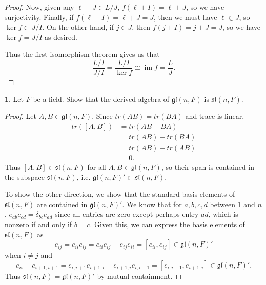 \documentclass[12pt]{article}
\DeclareMathOperator{\im}{im}
\newcommand{\gl}{\mathfrak{gl}}
\renewcommand{\sl}{\mathfrak{sl}}
\theoremstyle{definition}
\newtheorem{ex}{}
\begin{document}
\begin{proof}
	Now, given any $\ell + J \in L/J$, $f(\ell + I) = \ell + J$, so we have surjectivity.
	Finally, if $f(\ell + I) = \ell + J = J$, then we must have $\ell \in J$, so $\ker f \subset J/I$.
	On the other hand, if $j \in J$, then $f(j + I) = j + J = J$, so we have $\ker f = J/I$ as desired.

	Thus the first isomorphism theorem gives us that \begin{equation*}
		\frac{L/I}{J/I} = \frac{L/I}{\ker f} \cong \im f = \frac{L}{J}.
	\end{equation*}
\end{proof}

\begin{ex}
	Let $F$ be a field.
	Show that the derived algebra of $\gl(n, F)$ is $\sl(n, F)$.
\end{ex}
\begin{proof}
	Let $A, B \in \gl(n, F)$.
	Since $tr(AB) = tr(BA)$ and trace is linear, \begin{align*}
		tr([A, B]) & = tr(AB - BA)     \\
		           & = tr(AB) - tr(BA) \\
		           & = tr(AB) - tr(AB) \\
		           & = 0.
	\end{align*}
	Thus $[A, B] \in \sl(n, F)$ for all $A, B \in \gl(n, F)$, so their span is contained in the subspace $\sl(n, F)$, i.e. $\gl(n, F)' \subset \sl(n, F)$.

	To show the other direction, we show that the standard basis elements of $\sl(n, F)$ are contained in $\gl(n, F)'$.
	We know that for $a,b,c,d$ between 1 and $n$, $e_{ab}e_{cd} = \delta_{bc}e_{ad}$ since all entries are zero except perhaps entry $ad$, which is nonzero if and only if $b = c$.
	Given this, we can express the basis elements of $\sl(n, F)$ as \begin{equation*}
		e_{ij} = e_{ii}e_{ij} = e_{ii}e_{ij} - e_{ij}e_{ii} = [e_{ii},e_{ij}] \in \gl(n, F)'
	\end{equation*} when $i \neq j$ and \begin{equation*}
		e_{ii} - e_{i+1,i+1} = e_{i, i + 1}e_{i+1, i} - e_{i+1,i}e_{i,i+1} = [e_{i,i+1}, e_{i+1,i}] \in \gl(n, F)'.
	\end{equation*}
	Thus $\sl(n, F) = \gl(n, F)'$ by mutual containment.
\end{proof}
\end{document}
